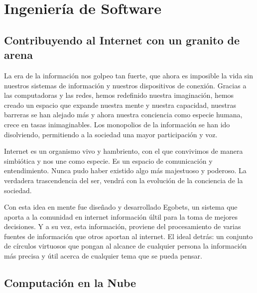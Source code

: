 \section{Ingeniería de Software}
\subsection{Contribuyendo al Internet con un granito de arena}
La era de la información nos golpeo tan fuerte, que ahora es imposible la vida sin nuestros sistemas de información y nuestros dispositivos de conexión. Gracias a las computadoras y las redes, hemos redefinido nuestra imaginación, hemos creado un espacio que expande nuestra mente y nuestra capacidad, nuestras barreras se han alejado más y ahora nuestra conciencia como especie humana, crece en tasas inimaginables. Los monopolios de la información se han ido disolviendo, permitiendo a la sociedad una mayor participación y voz.

Internet es un organismo vivo y hambriento, con el que convivimos de manera simbiótica y nos une como especie. Es un espacio de comunicación y entendimiento. Nunca pudo haber existido algo más majestuoso y poderoso. La verdadera trascendencia del ser, vendrá con la evolución de la conciencia de la sociedad.

Con esta idea en mente fue diseñado y desarrollado Egobets, un sistema que aporta a la comunidad en internet información últil para la toma de mejores decisiones. Y a su vez, esta información, proviene del procesamiento de varias fuentes de información que otros aportan al internet. El ideal detrás: un conjunto de círculos virtuosos que pongan al alcance de cualquier persona la información más precisa y útil acerca de cualquier tema que se pueda pensar.

\subsection{Computación en la Nube}

